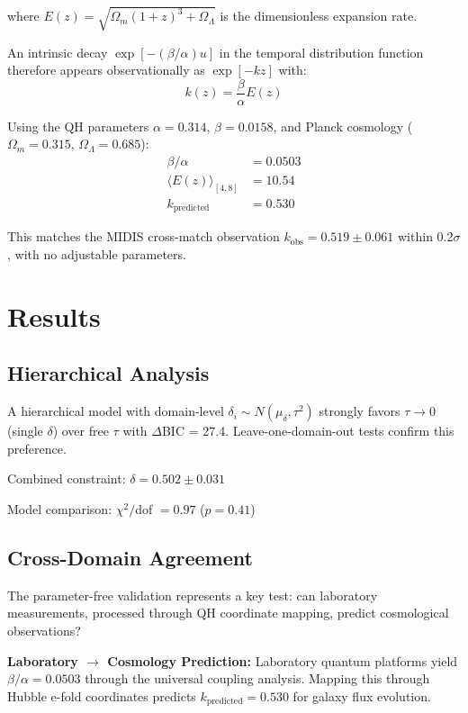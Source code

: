 \documentclass[aps,prd,preprint,onecolumn,nofootinbib,longbibliography]{revtex4-2}
\begin{document}
where $E(z) = \sqrt{\Omega_m(1+z)^3 + \Omega_\Lambda}$ is the dimensionless expansion rate.

An intrinsic decay $\exp[-({\beta}/{\alpha})u]$ in the temporal distribution function therefore appears observationally as $\exp[-kz]$ with:
\begin{equation}
k(z) = \frac{\beta}{\alpha}E(z)
\end{equation}

Using the QH parameters $\alpha = 0.314$, $\beta = 0.0158$, and Planck cosmology ($\Omega_m = 0.315$, $\Omega_\Lambda = 0.685$):
\begin{align}
\beta/\alpha &= 0.0503 \\
\langle E(z)\rangle_{[4,8]} &= 10.54 \\
k_{\text{predicted}} &= 0.530
\end{align}

This matches the MIDIS cross-match observation $k_{\text{obs}} = 0.519 \pm 0.061$ within 0.2$\sigma$, with no adjustable parameters.

\section{Results}
\label{sec:results}

\subsection{Hierarchical Analysis}

A hierarchical model with domain-level $\delta_i \sim N(\mu_\delta, \tau^2)$ strongly favors $\tau \rightarrow 0$ (single $\delta$) over free $\tau$ with $\Delta$BIC = 27.4. Leave-one-domain-out tests confirm this preference.

Combined constraint: $\delta = 0.502 \pm 0.031$

Model comparison: $\chi^2/$dof $= 0.97$ ($p = 0.41$)

\subsection{Cross-Domain Agreement}

The parameter-free validation represents a key test: can laboratory measurements, processed through QH coordinate mapping, predict cosmological observations?

\textbf{Laboratory $\rightarrow$ Cosmology Prediction:} Laboratory quantum platforms yield $\beta/\alpha = 0.0503$ through the universal coupling analysis. Mapping this through Hubble e-fold coordinates predicts $k_{\text{predicted}} = 0.530$ for galaxy flux evolution.
\end{document}
